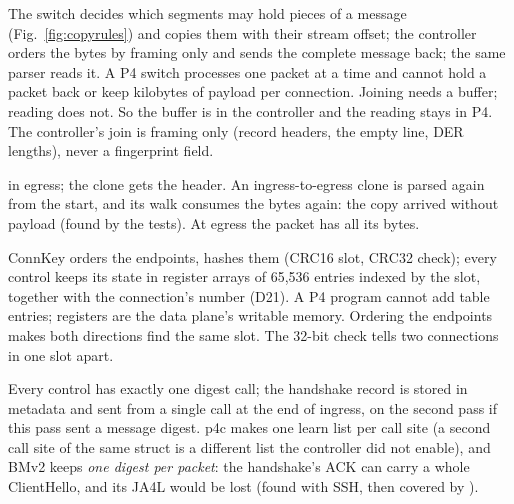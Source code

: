 {The switch decides which segments may hold pieces of a message (Fig.~\ref{fig:copyrules}) and copies them with
their stream offset; the controller orders the bytes by framing only and sends the complete message back; the
same parser reads it.}
{A P4 switch processes one packet at a time and cannot hold a packet back or keep kilobytes of payload per
connection. Joining needs a buffer; reading does not. So the buffer is in the controller and the reading stays in
P4. The controller's join is framing only (record headers, the empty line, DER lengths), never a fingerprint field.}

{ in egress; the clone gets the 
header.}
{An ingress-to-egress clone is parsed again from the start, and its walk consumes the bytes again: the copy
arrived without payload (found by the tests). At egress the packet has all its bytes.}

{ConnKey orders the endpoints, hashes them (CRC16 slot, CRC32 check); every control keeps its state in register
arrays of 65,536 entries indexed by the slot, together with the connection's number (D21).}
{A P4 program cannot add table entries; registers are the data plane's writable memory. Ordering the endpoints
makes both directions find the same slot. The 32-bit check tells two connections in one slot apart.}

{Every control has exactly one digest call; the handshake record is stored in metadata and sent from a single call
at the end of ingress, on the second pass if this pass sent a message digest.}
{p4c makes one learn list per call site (a second call site of the same struct is a different list the controller
did not enable), and BMv2 keeps \emph{one digest per packet}: the handshake's ACK can carry a whole ClientHello, and
its JA4L would be lost (found with SSH, then covered by ).}

